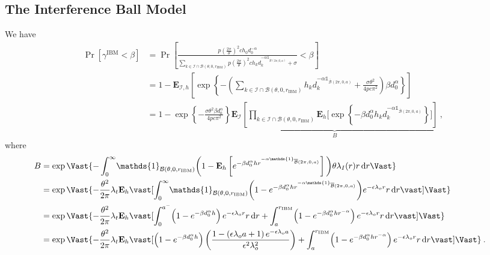 \documentclass[12pt, draftclsnofoot, onecolumn]{IEEEtran}
\begin{document}
\subsection{The Interference Ball Model}
We have
\begin{align}\label{eq: IBM-3-1}
\Pr\left[\gamma^{\mathrm{IBM}} < \beta \right]  &= \Pr\left[\frac{p \left(\frac{2\pi}{\theta} \right)^2 c h_0 d_{0}^{-\alpha}}{\sum\limits_{k \in \mathcal{I} \cap \mathcal{B}(\theta, 0, r_{\mathrm{IBM}})} p \left(\frac{2\pi}{\theta} \right)^2 c h_k d_{k}^{-\alpha \mathds{1}_{\overline{\mathcal{B}}(2\pi,0,a)}} + \sigma}  < \beta \right] \nonumber \\
& = 1 - \mathbf{E}_{\mathcal{I},h}\left[\exp\left\{ - \left( \sum\limits_{k \in \mathcal{I} \cap \mathcal{B}(\theta, 0, r_{\mathrm{IBM}})} h_k d_{k}^{-\alpha \mathds{1}_{\overline{\mathcal{B}}(2\pi,0,a)}} + \frac{\sigma \theta^2}{4 pc\pi^2} \right)\beta d_{0}^{\alpha} \right\} \right]  \nonumber \\
& = 1 - \exp\left\{ - \frac{\sigma \theta^2 \beta d_{0}^{\alpha}}{4 pc\pi^2} \right\}\underbrace{\mathbf{E}_{\mathcal{I}}\left[\prod\limits_{k \in \mathcal{I} \cap \mathcal{B}(\theta, 0, r_{\mathrm{IBM}})} \mathbf{E}_h \bigg[ \exp\left\{ - \beta d_{0}^{\alpha} h_k d_{k}^{-\alpha \mathds{1}_{\overline{\mathcal{B}}(2\pi,0,a)}} \right\} \bigg] \right] }_{B} \:,
\end{align}
where
\begin{align}\label{eq: IBM-4-1}
\hspace{-10mm} B & = \exp\Vast\{ - \int_{0}^{\infty} \! \mathds{1}_{\mathcal{B}(\theta,0,r_{\mathrm{IBM}})} \bigg( 1 - \mathbf{E}_h \left[e^{- \beta d_{0}^{\alpha} h r^{-\alpha \mathds{1}_{\overline{\mathcal{B}}(2\pi,0,a)}}} \right] \bigg) \theta \lambda_I(r) r \, \mathrm{d}r \Vast\} \nonumber \\
& = \exp\Vast\{ - \frac{\theta^2}{2 \pi} \lambda_t \mathbf{E}_h \vast[ \int_{0}^{\infty} \! \mathds{1}_{\mathcal{B}(\theta,0,r_{\mathrm{IBM}})} \bigg( 1 - e^{- \beta d_{0}^{\alpha} h r^{-\alpha \mathds{1}_{\overline{\mathcal{B}}(2\pi,0,a)}}} \bigg) e^{-\epsilon\lambda_o r} r \, \mathrm{d}r \vast] \Vast\} \nonumber \\
& = \exp\Vast\{ - \frac{\theta^2}{2 \pi} \lambda_t   \mathbf{E}_h \vast[\int_{0}^{a^{-}} \! \left( 1 - e^{- \beta d_{0}^{\alpha} h} \right) e^{-\epsilon\lambda_o r} r \, \mathrm{d}r + \int_{a}^{r_{\mathrm{IBM}}} \! \left( 1 - e^{- \beta d_{0}^{\alpha} h r^{-\alpha}} \right) e^{-\epsilon\lambda_o r} r \, \mathrm{d}r \vast] \Vast\} \nonumber \\
& = \exp\Vast\{ - \frac{\theta^2}{2 \pi} \lambda_t   \mathbf{E}_h \vast[\left( 1 - e^{- \beta d_{0}^{\alpha} h} \right) \left( \frac{1 - \left( \epsilon \lambda_o a+ 1 \right) e^{-\epsilon \lambda_o a}}{\epsilon^2 \lambda_{o}^{2}}\right) + \int_{a}^{r_{\mathrm{IBM}}} \! \left( 1 - e^{- \beta d_{0}^{\alpha} h r^{-\alpha}} \right) e^{-\epsilon\lambda_o r} r \, \mathrm{d}r \vast] \Vast\} \:.
\end{align}
\end{document}
